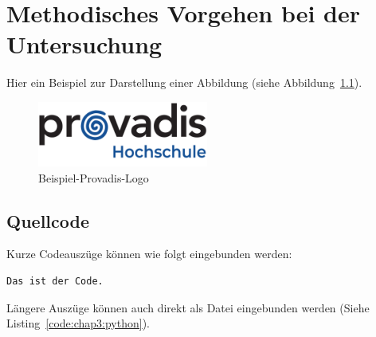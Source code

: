 %

\chapter{Methodisches Vorgehen bei der Untersuchung}

Hier ein Beispiel zur Darstellung einer Abbildung (siehe Abbildung~\ref{fig:chap3:provadis}).
 
\begin{figure}[htb]
\centering
\includegraphics[width=0.5\textwidth]{Bilder/Deckblatt/provadis-hochschule.pdf}
\caption{Beispiel-Provadis-Logo}
\label{fig:chap3:provadis}
\end{figure}

\section{Quellcode}
Kurze Codeauszüge können wie folgt eingebunden werden:

\begin{lstlisting}
Das ist der Code.
\end{lstlisting}

Längere Auszüge können auch direkt als Datei eingebunden werden (Siehe Listing~\ref{code:chap3:python}).

